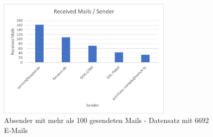 \begin{figure}
    \centering
    \includegraphics[width=0.75\textwidth]{images/Merged_Auswertung_Empfange_Emails.png}
    \caption{Absender mit mehr als 100 gesendeten Mails - Datensatz mit 6692 E-Mails} 
    \label{fig:receivedemailsmerged}
\end{figure}

\newpage